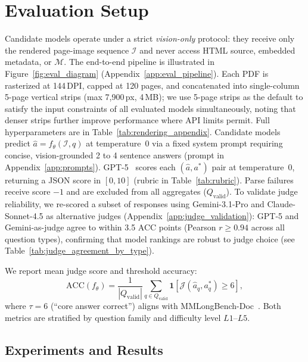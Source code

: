 \section{Evaluation Setup}

Candidate models operate under a strict \emph{vision-only} protocol: they receive only the rendered page-image sequence $\mathcal{I}$ and never access HTML source, embedded metadata, or $\mathcal{M}$. The end-to-end pipeline is illustrated in Figure~\ref{fig:eval_diagram} (Appendix~\ref{app:eval_pipeline}).
Each PDF is rasterized at 144\,DPI, capped at 120 pages, and concatenated into single-column 5-page vertical strips (max 7{,}900\,px, 4\,MB); we use 5-page strips as the default to satisfy the input constraints of all evaluated models simultaneously, noting that denser strips further improve performance where API limits permit. Full hyperparameters are in Table~\ref{tab:rendering_appendix}. Candidate models predict $\hat{a} = f_\theta(\mathcal{I}, q)$ at temperature~0 via a fixed system prompt requiring concise, vision-grounded 2 to 4 sentence answers (prompt in Appendix~\ref{app:prompts}). GPT-5~\citep{openai2025gpt5} scores each $(\hat{a}, a^*)$ pair at temperature~0, returning a JSON score in $[0,10]$ (rubric in Table~\ref{tab:rubric}). Parse failures receive score $-1$ and are excluded from all aggregates ($Q_{\mathrm{valid}}$). To validate judge reliability, we re-scored a subset of responses using Gemini-3.1-Pro and Claude-Sonnet-4.5 as alternative judges (Appendix~\ref{app:judge_validation}): GPT-5 and Gemini-as-judge agree to within 3.5 ACC points (Pearson $r \geq 0.94$ across all question types), confirming that model rankings are robust to judge choice (see Table~\ref{tab:judge_agreement_by_type}).

We report mean judge score and threshold accuracy:
\begin{equation}
  \text{ACC}(f_\theta) = \frac{1}{|Q_{\mathrm{valid}}|}
    \sum_{q \in Q_{\mathrm{valid}}}
    \mathbf{1}\!\left[\mathcal{J}(\hat{a}_q, a^*_q) \ge 6\right],
  \label{eq:acc}
\end{equation}
where $\tau{=}6$ (``core answer correct'') aligns with MMLongBench-Doc~\citep{ma2024mmlongbenchdoc}. Both metrics are stratified by question family and difficulty level $L1$--$L5$.

\subsection{Experiments and Results}
\label{sec:main_results}

